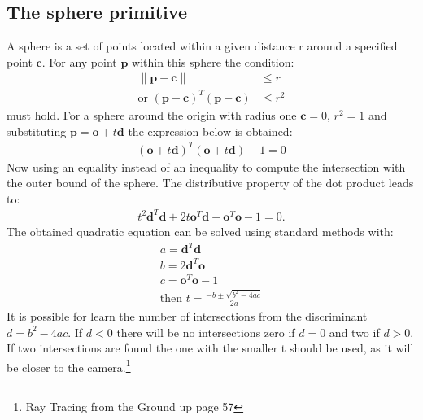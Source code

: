 \subsection{The sphere primitive}
A sphere is a set of points located within a given distance r around a specified point $\mathbf{c}$. For any point $\mathbf{p}$ within this sphere the condition:
\begin{align}
\|\mathbf{p} - \mathbf{c} \| &\leq r \\
\text{or } (\mathbf{p} - \mathbf{c})^T (\mathbf{p} - \mathbf{c}) &\leq r^2
\end{align}
must hold. For a sphere around the origin with radius one $\mathbf{c} = 0$, $r^2 = 1$ and substituting $\mathbf{p} = \mathbf{o} + t\mathbf{d}$ the expression below is obtained:
\begin{align}
(\mathbf{o} + t\mathbf{d})^T (\mathbf{o} + t\mathbf{d}) - 1 = 0 
\end{align}
Now using an equality instead of an inequality to compute the intersection with the outer bound of the sphere. 
The distributive property of the dot product leads to:
\begin{align}
t^2 \mathbf{d}^T \mathbf{d} + 2t\mathbf{o}^T \mathbf{d} + \mathbf{o}^T \mathbf{o} - 1 = 0.
\end{align}
The obtained quadratic equation can be solved using standard methods with:
\begin{align}
a = \mathbf{d}^T \mathbf{d} \\
b = 2\mathbf{d}^T \mathbf{o} \\
c = \mathbf{o}^T \mathbf{o} - 1 \\
\text{then  } t = \frac{-b \pm \sqrt{b^2 - 4ac}}{2a}
\end{align}
It is possible for learn the number of intersections from the discriminant $d = b^2 - 4ac$. If $d < 0$ there will be no intersections zero if $d = 0$ and two if $d > 0$. If two intersections are found the one with the smaller t should be used, as it will be closer to the camera.\footnote{Ray Tracing from the Ground up page 57}

